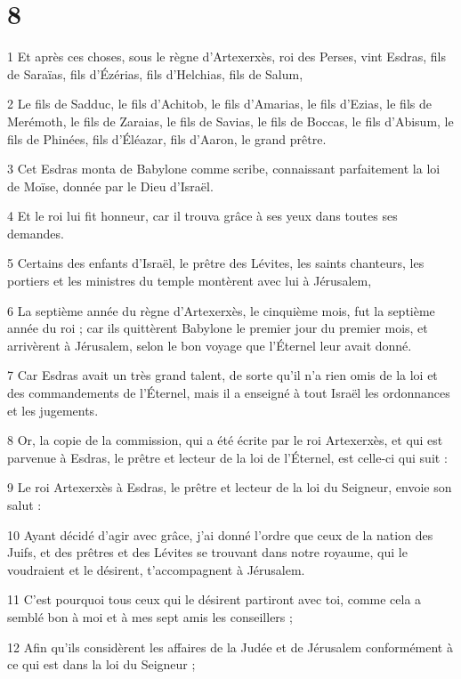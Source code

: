 \chapter{8}

\par 1 Et après ces choses, sous le règne d'Artexerxès, roi des Perses, vint Esdras, fils de Saraïas, fils d'Ézérias, fils d'Helchias, fils de Salum,
\par 2 Le fils de Sadduc, le fils d'Achitob, le fils d'Amarias, le fils d'Ezias, le fils de Merémoth, le fils de Zaraias, le fils de Savias, le fils de Boccas, le fils d'Abisum, le fils de Phinées, fils d'Éléazar, fils d'Aaron, le grand prêtre.
\par 3 Cet Esdras monta de Babylone comme scribe, connaissant parfaitement la loi de Moïse, donnée par le Dieu d'Israël.
\par 4 Et le roi lui fit honneur, car il trouva grâce à ses yeux dans toutes ses demandes.
\par 5 Certains des enfants d'Israël, le prêtre des Lévites, les saints chanteurs, les portiers et les ministres du temple montèrent avec lui à Jérusalem,
\par 6 La septième année du règne d'Artexerxès, le cinquième mois, fut la septième année du roi ; car ils quittèrent Babylone le premier jour du premier mois, et arrivèrent à Jérusalem, selon le bon voyage que l'Éternel leur avait donné.
\par 7 Car Esdras avait un très grand talent, de sorte qu'il n'a rien omis de la loi et des commandements de l'Éternel, mais il a enseigné à tout Israël les ordonnances et les jugements.
\par 8 Or, la copie de la commission, qui a été écrite par le roi Artexerxès, et qui est parvenue à Esdras, le prêtre et lecteur de la loi de l'Éternel, est celle-ci qui suit :
\par 9 Le roi Artexerxès à Esdras, le prêtre et lecteur de la loi du Seigneur, envoie son salut :
\par 10 Ayant décidé d'agir avec grâce, j'ai donné l'ordre que ceux de la nation des Juifs, et des prêtres et des Lévites se trouvant dans notre royaume, qui le voudraient et le désirent, t'accompagnent à Jérusalem.
\par 11 C'est pourquoi tous ceux qui le désirent partiront avec toi, comme cela a semblé bon à moi et à mes sept amis les conseillers ;
\par 12 Afin qu'ils considèrent les affaires de la Judée et de Jérusalem conformément à ce qui est dans la loi du Seigneur ;
